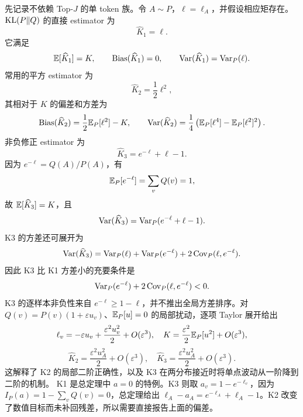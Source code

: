 先记录不依赖 Top-$J$ 的单 token 族。令 $A\sim P$，$\ell=\ell_A$，并假设相应矩存在。$\operatorname{KL}(P\Vert Q)$ 的直接 estimator 为
\begin{equation*}
 \widehat K_1=\ell.
\end{equation*}
它满足
\begin{equation*}
 \mathbb E[\widehat K_1]=K,\qquad
 \operatorname{Bias}(\widehat K_1)=0,\qquad
 \operatorname{Var}(\widehat K_1)=\operatorname{Var}_P(\ell).
\end{equation*}
常用的平方 estimator 为
\begin{equation*}
 \widehat K_2=\frac12\ell^2,
\end{equation*}
其相对于 $K$ 的偏差和方差为
\begin{equation}
 \operatorname{Bias}(\widehat K_2)=\frac12\mathbb E_P[\ell^2]-K,
 \qquad
 \operatorname{Var}(\widehat K_2)=\frac14\left(\mathbb E_P[\ell^4]-\mathbb E_P[\ell^2]^2\right).
 \label{est:eq:chapter3-k2-bias-var}
\end{equation}
非负修正 estimator 为
\begin{equation*}
 \widehat K_3=e^{-\ell}+\ell-1.
\end{equation*}
因为 $e^{-\ell}=Q(A)/P(A)$，有
\begin{equation*}
 \mathbb E_P[e^{-\ell}]=\sum_vQ(v)=1,
\end{equation*}
故 $\mathbb E[\widehat K_3]=K$，且
\begin{equation}
 \operatorname{Var}(\widehat K_3)=\operatorname{Var}_P(e^{-\ell}+\ell-1).
 \label{est:eq:chapter3-k3-var}
\end{equation}
K3 的方差还可展开为
\begin{equation*}
 \operatorname{Var}(\widehat K_3)
 =\operatorname{Var}_P(\ell)+\operatorname{Var}_P(e^{-\ell})+2\operatorname{Cov}_P(\ell,e^{-\ell}).
\end{equation*}
因此 K3 比 K1 方差小的充要条件是
\begin{equation*}
 \operatorname{Var}_P(e^{-\ell})+2\operatorname{Cov}_P(\ell,e^{-\ell})<0.
\end{equation*}
K3 的逐样本非负性来自 $e^{-\ell}\geq1-\ell$，并不推出全局方差排序。对 $Q(v)=P(v)(1+\varepsilon u_v)$、$\mathbb E_P[u]=0$ 的局部扰动，逐项 Taylor 展开给出
\begin{equation*}
 \ell_v=-\varepsilon u_v+\frac{\varepsilon^2u_v^2}{2}+O(\varepsilon^3),
 \quad K=\frac{\varepsilon^2}{2}\mathbb E_P[u^2]+O(\varepsilon^3),
\end{equation*}
\begin{equation*}
 \widehat K_2=\frac{\varepsilon^2u_A^2}{2}+O(\varepsilon^3),
 \quad \widehat K_3=\frac{\varepsilon^2u_A^2}{2}+O(\varepsilon^3).
\end{equation*}
这解释了 K2 的局部二阶正确性，以及 K3 在两分布接近时将单点波动从一阶降到二阶的机制。
K1 是总定理中 $a=0$ 的特例。K3 则取 $a_v=1-e^{-\ell_v}$，因为 $I_P(a)=1-\sum_vQ(v)=0$，总定理给出 $\ell_A-a_A=e^{-\ell_A}+\ell_A-1$。K2 改变了数值目标而未补回残差，所以需要直接报告上面的偏差。

